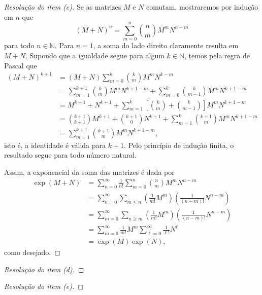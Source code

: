\begin{proof}[Resolução do item (c)]
    Se as matrizes \(M\) e \(N\) comutam, mostraremos por indução em \(n\) que
    \begin{equation*}
        (M + N)^n = \sum_{m = 0}^{n} \binom{n}{m} M^m N^{n-m}
    \end{equation*}
    para todo \(n \in \mathbb{N}\). Para \(n = 1\), a soma do lado direito claramente resulta em \(M + N\). Supondo que a igualdade segue para algum \(k \in \mathbb{N}\), temos pela regra de Pascal que
    \begin{align*}
        (M+N)^{k+1} &= (M+N)\sum_{m=0}^k\binom{k}{m} M^m N^{k-m}\\
                    &= \sum_{m = 1}^{k+1} \binom{k}{m} M^m N^{k+1-m} + \sum_{m=0}^{k} \binom{k}{m-1} M^m N^{k+1-m}\\
                    &= M^{k+1} + N^{k+1} + \sum_{m=1}^{k} \left[\binom{k}{m} + \binom{k}{m-1}\right] M^m N^{k+1-m}\\
                    &= \binom{k+1}{k+1} M^{k+1} + \binom{k+1}{0}N^{k+1} + \sum_{m=1}^{k} \binom{k+1}{m} M^m N^{k+1-m}\\
                    &= \sum_{m=1}^{k+1} \binom{k+1}{m} M^m N^{k+1 - m},
    \end{align*}
    isto é, a identidade é válida para \(k+1\). Pelo princípio de indução finita, o resultado segue para todo número natural.

    Assim, a exponencial da soma das matrizes é dada por
    \begin{align*}
        \exp(M+N) &= \sum_{n = 0}^\infty \frac{1}{n!} \sum_{m=0}^n \binom{n}{m} M^m N^{n - m}\\
                  &= \sum_{n=0}^\infty \sum_{m\leq n} \left(\frac{1}{m!}M^m\right) \left(\frac{1}{(n-m)!} N^{n-m}\right)\\
                  &= \sum_{m=0}^\infty \sum_{n \geq m} \left(\frac{1}{m!} M^m\right) \left(\frac{1}{(n-m)!}N^{n-m}\right)\\
                  &= \sum_{m=0}^\infty \frac{1}{m!} M^m \sum_{\ell = 0}^\infty \frac{1}{\ell!} N^\ell\\
                  &= \exp(M)\exp(N),
    \end{align*}
    como desejado.
\end{proof}
\begin{proof}[Resolução do item (d)]

\end{proof}
\begin{proof}[Resolução do item (e)]

\end{proof}
